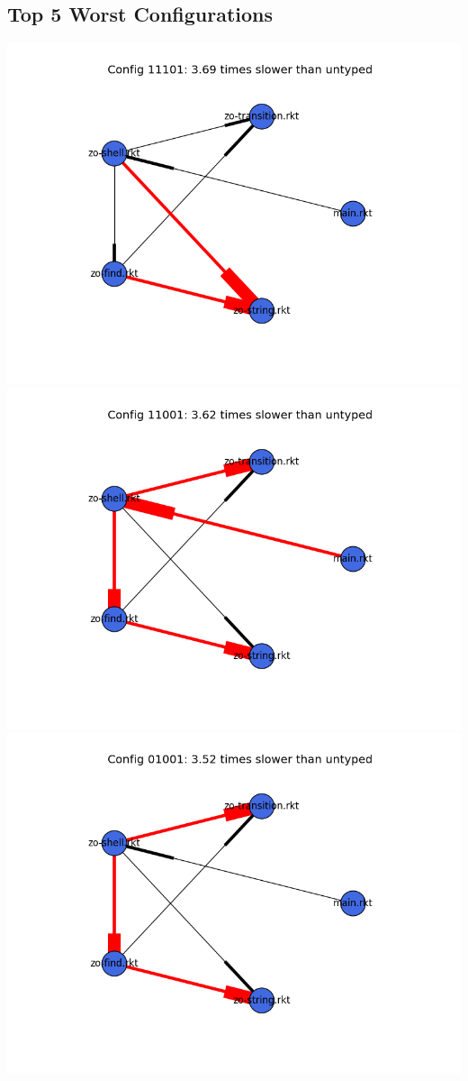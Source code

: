 \documentclass{article}
\begin{document}
\begin{itemize}
\subsection{Top 5 Worst Configurations}
\includegraphics[width=\textwidth]{zordoz-module-graph-11101.png}
\includegraphics[width=\textwidth]{zordoz-module-graph-11001.png}
\includegraphics[width=\textwidth]{zordoz-module-graph-01001.png}

\end{itemize}
\end{document}
